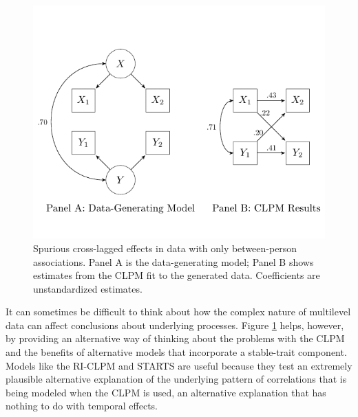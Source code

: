 \documentclass[
  english,
  man,floatsintext]{apa6}
\begin{document}
\begin{figure}
\centering
\includegraphics{images/clpm.pdf}
\caption{\label{fig:spurious}Spurious cross-lagged effects in data with only between-person associations. Panel A is the data-generating model; Panel B shows estimates from the CLPM fit to the generated data. Coefficients are unstandardized estimates.}
\end{figure}

It can sometimes be difficult to think about how the complex nature of multilevel data can affect conclusions about underlying processes. Figure \ref{fig:spurious} helps, however, by providing an alternative way of thinking about the problems with the CLPM and the benefits of alternative models that incorporate a stable-trait component. Models like the RI-CLPM and STARTS are useful because they test an extremely plausible alternative explanation of the underlying pattern of correlations that is being modeled when the CLPM is used, an alternative explanation that has nothing to do with temporal effects.
\end{document}
